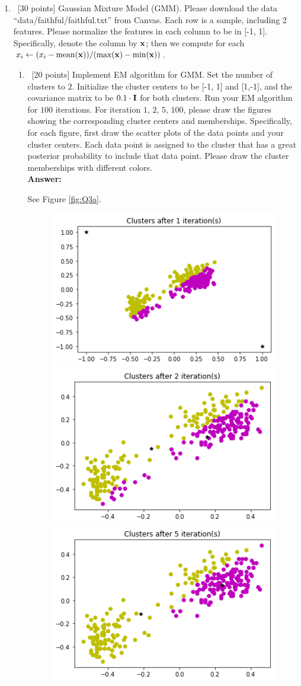 \documentclass[12pt, fullpage,letterpaper]{article}
\def\red{\color{black!30!red}}
\def\blackblue{\color{black!40!blue}}
\begin{document}
\begin{enumerate}
	\item~[30 points] Gaussian Mixture Model (GMM). Please download the data ``data/faithful/faithful.txt''  from Canvas. Each row is a sample, including 2 features. Please normalize the features in each column to be in [-1, 1]. Specifically, denote the column by ${\bf x}$; then we compute for each $x_i \leftarrow (x_i - \mathrm{mean}({\bf x}))/(\max({\bf x}) - \min({\bf x}))$. 
	\begin{enumerate}
		\item~[20 points] Implement EM algorithm for GMM. Set the number of clusters to $2$. Initialize the cluster centers to be [-1, 1] and [1,-1], and the covariance matrix to be $0.1\cdot{\bf I}$ for both clusters. Run your EM algorithm for $100$ iterations. For iteration $1$, $2$, $5$, $100$, please draw the figures showing the corresponding cluster centers and memberships. Specifically, for each figure, first draw the scatter plots of the data points and your cluster centers. Each data point is assigned to the cluster that has a great posterior probability to include that data point. Please draw the cluster memberships with different colors. \\
{\bf \red Answer: }{\blackblue 
See Figure \ref{fig:Q3a}.
\begin{figure}[h]
\centering
\includegraphics[width=0.4\linewidth]{Images/Q3a1.png} 
\includegraphics[width=0.4\linewidth]{Images/Q3a2.png} \\
\includegraphics[width=0.4\linewidth]{Images/Q3a3.png} 

\end{figure}}
\end{enumerate}
\end{enumerate}
\end{document}
